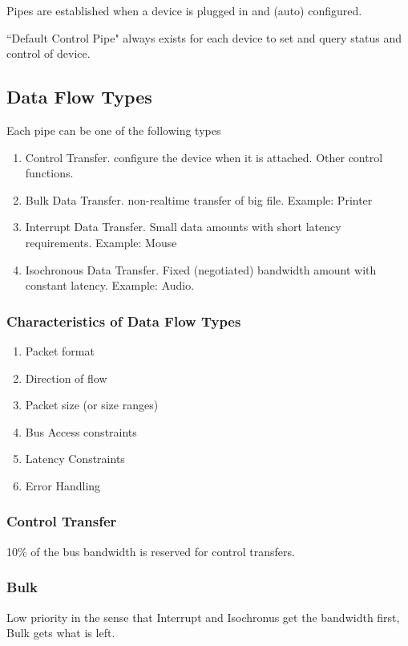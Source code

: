 Pipes are established when a device is plugged in and (auto)
configured.

``Default Control Pipe" always exists for each device to
set and query status and control of device.

\subsection{Data Flow Types}
Each pipe can be one of the following types
\begin{enumerate}
        \item Control Transfer. configure the device when
        it is attached.  Other control functions.
        \item Bulk Data Transfer. non-realtime transfer
        of big file.  Example: Printer
        \item Interrupt Data Transfer.  Small data amounts
        with short latency requirements. Example: Mouse
        \item Isochronous Data Transfer. Fixed (negotiated)
        bandwidth amount with constant latency. Example:
        Audio.
\end{enumerate}

\subsubsection{Characteristics of Data Flow Types}
\begin{enumerate}
	\item Packet format
	\item Direction of flow
	\item Packet size (or size ranges)
	\item Bus Access constraints
	\item Latency Constraints
	\item Error Handling
\end{enumerate}

\subsubsection{Control Transfer}
10\% of the bus bandwidth is reserved for control transfers.

\subsubsection{Bulk}
Low priority in the sense that Interrupt and Isochronus
get the bandwidth first, Bulk gets what is left.

